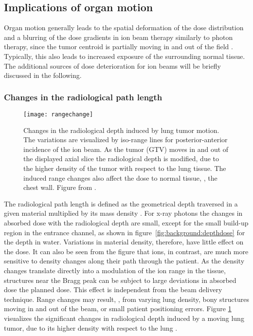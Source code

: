 

\subsection{Implications of organ motion}
\label{sec:background:implications}
Organ motion generally leads to the spatial deformation of the dose
distribution and a blurring of the dose gradients in ion beam therapy
similarly to photon therapy, since the tumor centroid is partially
moving in and out of the field \citep{Bortfeld2004}. Typically, this
also leads to increased exposure of the surrounding normal tissue. The
additional sources of dose deterioration for ion beams will be
briefly discussed in the following.

\subsubsection{Changes in the radiological path length}
\begin{figure}[tbp]
  \centering
  \texttt{[image: rangechange]}
  \caption[Changes in the radiological depth induced by lung tumor
  motion.]{Changes in the radiological depth induced by lung tumor
    motion. The variations are visualized by iso-range lines for
    posterior-anterior incidence of the ion beam. As the tumor
    (\acs{GTV}) moves in and out of the displayed axial slice the
    radiological depth is modified, due to the higher density of the
    tumor with respect to the lung tissue. The induced range changes
    also affect the dose to normal tissue, \eg, the chest wall. Figure
    from \citet{Bert2011}.}
  \label{fig:background:range}
\end{figure}
The radiological path length is defined as the geometrical depth
traversed in a given material multiplied by its mass density
\citep{Alpen1998}. For x-ray photons the changes in absorbed dose with
the radiological depth are small, except for the small build-up region
in the entrance channel, as shown in
figure~\vref{fig:background:depthdose} for the depth in
water. Variations in material density, therefore, have little effect
on the dose. It can also be seen from the figure that ions, in
contrast, are much more sensitive to density changes along their path
through the patient. As the density changes translate directly into a
modulation of the ion range in the tissue, structures near the Bragg
peak can be subject to large deviations in absorbed dose \wrt the
planned dose. This effect is independent from the beam delivery
technique. Range changes may result, \eg, from varying lung density,
bony structures moving in and out of the beam, or small patient
positioning errors.  Figure \ref{fig:background:range} visualizes the
significant changes in radiological depth induced by a moving lung
tumor, due to its higher density with respect to the lung
\citep{Bert2011}.

